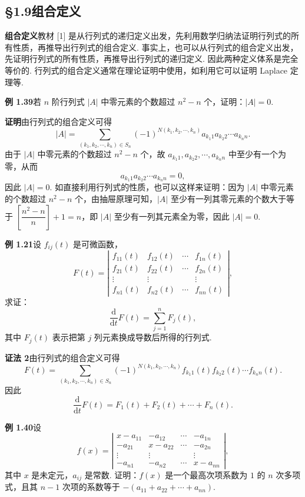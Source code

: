 \documentclass[UTF8, 12pt, fontset=fandol, oneside]{ctexart}
\begin{document}
\subsection*{§1.9\quad 组合定义}

\noindent\textbf{组合定义}\quad 教材 [1] 是从行列式的递归定义出发，先利用数学归纳法证明行列式的所有性质，再推导出行列式的组合定义. 事实上，也可以从行列式的组合定义出发，先证明行列式的所有性质，再推导出行列式的递归定义. 因此两种定义体系是完全等价的. 行列式的组合定义通常在理论证明中使用，如利用它可以证明 Laplace 定理等.

\noindent\textbf{例 1.39}\quad 若 $n$ 阶行列式 $|A|$ 中零元素的个数超过 $n^2-n$ 个，证明：$|A|=0$.

\noindent\textbf{证明}\quad 由行列式的组合定义可得
\[
|A|=\sum_{(k_1,k_2,\cdots,k_n)\in S_n}
(-1)^{N(k_1,k_2,\cdots,k_n)}a_{k_1 1}a_{k_2 2}\cdots a_{k_n n}.
\]
由于 $|A|$ 中零元素的个数超过 $n^2-n$ 个，故 $a_{k_1 1},a_{k_2 2},\cdots,a_{k_n n}$ 中至少有一个为零，从而
\[
a_{k_1 1}a_{k_2 2}\cdots a_{k_n n}=0,
\]
因此 $|A|=0$. 如直接利用行列式的性质，也可以这样来证明：因为 $|A|$ 中零元素的个数超过 $n^2-n$ 个，由抽屉原理可知，$|A|$ 至少有一列其零元素的个数大于等于 $\left[\dfrac{n^2-n}{n}\right]+1=n$，即 $|A|$ 至少有一列其元素全为零，因此 $|A|=0$.

\noindent\textbf{例 1.21}\quad 设 $f_{ij}(t)$ 是可微函数，
\[
F(t)=\left|\begin{array}{cccc}
f_{11}(t) & f_{12}(t) & \cdots & f_{1n}(t)\\
f_{21}(t) & f_{22}(t) & \cdots & f_{2n}(t)\\
\vdots & \vdots &        & \vdots\\
f_{n1}(t) & f_{n2}(t) & \cdots & f_{nn}(t)
\end{array}\right|,
\]
求证：
\[
\frac{\mathrm{d}}{\mathrm{d}t}F(t)=\sum_{j=1}^nF_j(t),
\]
其中 $F_j(t)$ 表示把第 $j$ 列元素换成导数后所得的行列式.

\noindent\textbf{证法 2}\quad 由行列式的组合定义可得
\[
F(t)=\sum_{(k_1,k_2,\cdots,k_n)\in S_n}
(-1)^{N(k_1,k_2,\cdots,k_n)}f_{k_1 1}(t)f_{k_2 2}(t)\cdots f_{k_n n}(t).
\]
因此
\[
\frac{\mathrm{d}}{\mathrm{d}t}F(t)=F_1(t)+F_2(t)+\cdots+F_n(t).
\]

\noindent\textbf{例 1.40}\quad 设
\[
f(x)=\left|\begin{array}{cccc}
x-a_{11} & -a_{12} & \cdots & -a_{1n}\\
-a_{21} & x-a_{22} & \cdots & -a_{2n}\\
\vdots & \vdots &        & \vdots\\
-a_{n1} & -a_{n2} & \cdots & x-a_{nn}
\end{array}\right|,
\]
其中 $x$ 是未定元，$a_{ij}$ 是常数. 证明：$f(x)$ 是一个最高次项系数为 $1$ 的 $n$ 次多项式，且其 $n-1$ 次项的系数等于 $-(a_{11}+a_{22}+\cdots+a_{nn})$.
\end{document}

